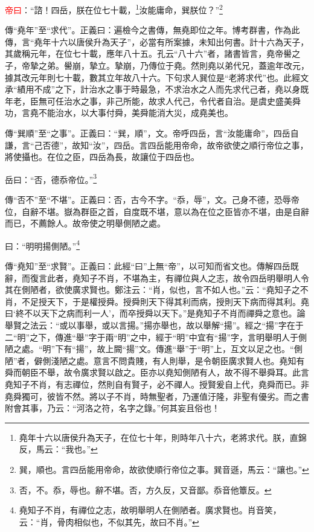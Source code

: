 \textcolor{red}{帝曰}：“諮！四岳，朕在位七十載，\footnote{堯年十六以唐侯升為天子，在位七十年，則時年八十六，老將求代。朕，直錦反，馬云：“我也。”}汝能庸命，巽朕位？”\footnote{巽，順也。言四岳能用帝命，故欲使順行帝位之事。巽音遜，馬云：“讓也。”}

{\noindent\zhuan{}\fzbyks 傳“堯年”至“求代”。正義曰：遍檢今之書傳，無堯即位之年。博考群書，作為此傳，言“堯年十六以唐侯升為天子”，必當有所案據，未知出何書。計十六為天子，其歲稱元年，在位七十載，應年八十五。孔云“八十六”者，諸書皆言，堯帝嚳之子，帝摯之弟。嚳崩，摯立。摯崩，乃傳位于堯。然則堯以弟代兄，蓋逾年改元，據其改元年則七十載，數其立年故八十六。下句求人巽位是“老將求代”也。此經文承“績用不成”之下，計治水之事于時最急，不求治水之人而先求代己者，堯以身既年老，臣無可任治水之事，非己所能，故求人代己，令代者自治。是虞史盛美舜功，言堯不能治水，以大事付舜，美舜能消大災，成堯美也。 \par}

{\noindent\zhuan{}\fzbyks 傳“巽順”至“之事”。正義曰：“巽，順”，文。帝呼四岳，言“汝能庸命”，四岳自謙，言“己否德”，故知“汝”，四岳。言四岳能用帝命，故帝欲使之順行帝位之事，將使攝也。在位之臣，四岳為長，故讓位于四岳也。 \par}

岳曰：“否，德忝帝位。”\footnote{否，不。忝，辱也。辭不堪。否，方久反，又音鄙。忝音他簟反。}

{\noindent\zhuan{}\fzbyks 傳“否不”至“不堪”。正義曰：否，古今不字。“忝，辱”，文。己身不德，恐辱帝位，自辭不堪。嶽為群臣之首，自度既不堪，意以為在位之臣皆亦不堪，由是自辭而已，不薦餘人。故帝使之明舉側陋之處。 \par}

曰：“明明揚側陋。”\footnote{堯知子不肖，有禪位之志，故明舉明人在側陋者。廣求賢也。肖音笑，云：“肖，骨肉相似也，不似其先，故曰不肖。”}

{\noindent\zhuan{}\fzbyks 傳“堯知”至“求賢”。正義曰：此經“曰”上無“帝”，以可知而省文也。傳解四岳既辭，而復言此者，堯知子不肖，不堪為主，有禪位與人之志，故令四岳明舉明人令其在側陋者，欲使廣求賢也。鄭注云：“肖，似也，言不如人也。”云：“堯知子之不肖，不足授天下，于是權授舜。授舜則天下得其利而病，授則天下病而得其利。堯曰‘終不以天下之病而利一人’，而卒授舜以天下。”是堯知子不肖而禪舜之意也。論舉賢之法云：“或以事舉，或以言揚。”揚亦舉也，故以舉解“揚”。經之“揚”字在于二“明”之下，傳進“舉”字于兩“明”之中，經于“明”中宜有“揚”字，言明舉明人于側陋之處。“明”下有“揚”，故上闕“揚”文。傳進“舉”于“明”上，互文以足之也。“側陋”者，僻側淺陋之處。意言不問貴賤，有人則舉，是令朝臣廣求賢人也。堯知有舜而朝臣不舉，故令廣求賢以啟之。臣亦以堯知側陋有人，故不得不舉舜耳。此言堯知子不肖，有志禪位，然則自有賢子，必不禪人。授賢爰自上代，堯舜而已。非堯舜獨可，彼皆不然。將以子不肖，時無聖者，乃運值汙隆，非聖有優劣。而之書附會其事，乃云：“河洛之符，名字之錄。”何其妄且俗也！ \par}

